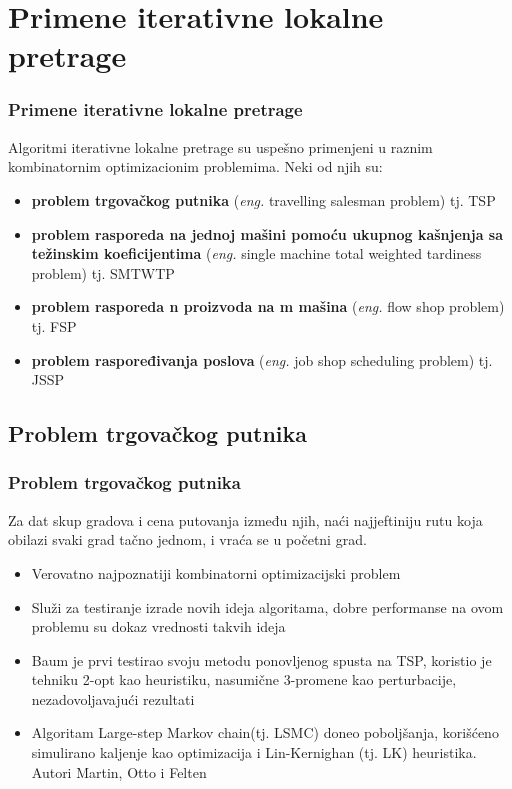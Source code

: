 \documentclass{beamer}
\newcommand{\eng}[1]{(\textit{eng.} #1)}
\begin{document}

\section{Primene iterativne lokalne pretrage}
\begin{frame}[fragile]\frametitle{Primene iterativne lokalne pretrage}
Algoritmi iterativne lokalne pretrage su uspešno primenjeni u raznim kombinatornim optimizacionim problemima. Neki od njih su:
\begin{itemize}
   \item \textbf{problem trgovačkog putnika} \eng{travelling salesman problem} tj. TSP
  \item \textbf{problem rasporeda na jednoj mašini pomoću ukupnog kašnjenja sa težinskim koeficijentima} \eng{single machine total weighted tardiness problem} tj. SMTWTP
  \item \textbf{problem rasporeda n proizvoda na m mašina} \eng{flow shop problem} tj. FSP
  \item \textbf{problem raspoređivanja poslova} \eng{job shop scheduling problem} tj. JSSP
\end{itemize}

\end{frame}

\subsection{Problem trgovačkog putnika}
\begin{frame}[fragile]\frametitle{Problem trgovačkog putnika}
Za dat skup gradova i cena putovanja između njih, naći najjeftiniju rutu koja obilazi svaki grad tačno jednom, i vraća se u početni grad.
\begin{itemize}
  \item Verovatno najpoznatiji kombinatorni optimizacijski problem
  \item Služi za testiranje izrade novih ideja algoritama, dobre performanse na ovom problemu su dokaz vrednosti takvih ideja
  \item Baum je prvi testirao svoju metodu ponovljenog spusta na TSP, koristio je tehniku 2-opt kao heuristiku, nasumične 3-promene kao perturbacije, nezadovoljavajući rezultati
  \item Algoritam Large-step Markov chain(tj. LSMC) doneo poboljšanja, korišćeno simulirano kaljenje kao optimizacija i Lin-Kernighan (tj. LK) heuristika. Autori Martin, Otto i Felten
\end{itemize}
\end{frame}
\end{document}
